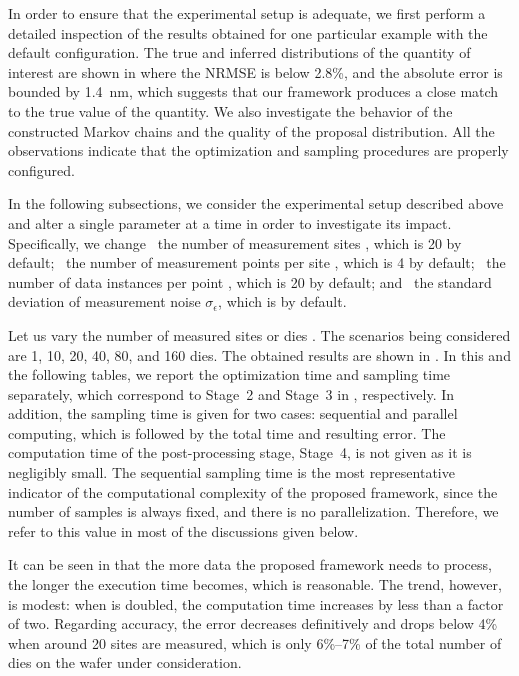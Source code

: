 In order to ensure that the experimental setup is adequate, we first perform a
detailed inspection of the results obtained for one particular example with the
default configuration. The true and inferred distributions of the quantity of
interest are shown in  where the \ac{NRMSE}
is below 2.8\%, and the absolute error is bounded by 1.4~nm, which suggests that
our framework produces a close match to the true value of the quantity. We also
investigate the behavior of the constructed Markov chains and the quality of the
proposal distribution. All the observations indicate that the optimization and
sampling procedures are properly configured.

In the following subsections, we consider the experimental setup described above
and alter a single parameter at a time in order to investigate its impact.
Specifically, we change \one~the number of measurement sites \hnd, which is 20
by default; \two~the number of measurement points per site \np, which is 4 by
default; \three~the number of data instances per point \ns, which is 20 by
default; and \four~the standard deviation of measurement noise
$\sigma_\epsilon$, which is  by default.


Let us vary the number of measured sites or dies \hnd. The scenarios being
considered are 1, 10, 20, 40, 80, and 160 dies. The obtained results are shown
in . In this and the following tables, we report the
optimization time and sampling time separately, which correspond to Stage~2 and
Stage~3 in , respectively. In addition, the sampling time
is given for two cases: sequential and parallel computing, which is followed by
the total time and resulting error. The computation time of the post-processing
stage, Stage~4, is not given as it is negligibly small. The sequential sampling
time is the most representative indicator of the computational complexity of the
proposed framework, since the number of samples is always fixed, and there is no
parallelization. Therefore, we refer to this value in most of the discussions
given below.

It can be seen in  that the more data the proposed framework
needs to process, the longer the execution time becomes, which is reasonable.
The trend, however, is modest: when \hnd is doubled, the computation time
increases by less than a factor of two. Regarding accuracy, the error decreases
definitively and drops below 4\% when around 20 sites are measured, which is
only 6\%--7\% of the total number of dies on the wafer under consideration.

